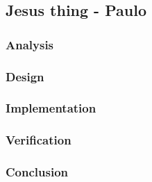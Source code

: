 \subsection{Jesus thing - Paulo}
%
\subsubsection{Analysis}
%
%
\subsubsection{Design}
%
%
\subsubsection{Implementation}
%
%
\subsubsection{Verification}
%
\subsubsection{Conclusion}
